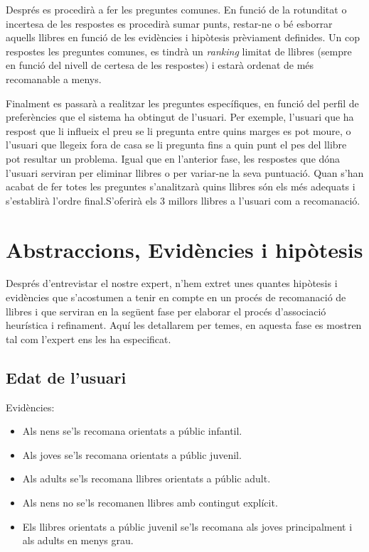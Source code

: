 Després es procedirà a fer les preguntes comunes. En funció de la rotunditat o incertesa de les respostes es procedirà sumar punts, restar-ne o bé esborrar aquells llibres en funció de les evidències i hipòtesis prèviament definides. Un cop respostes les preguntes comunes, es tindrà un \emph{ranking} limitat de llibres (sempre en funció del nivell de certesa de les respostes) i estarà ordenat de més recomanable a menys.

Finalment es passarà a realitzar les preguntes específiques, en funció del perfil de preferències que el sistema ha obtingut de l'usuari. Per exemple, l'usuari que ha respost que li influeix el preu se li pregunta entre quins marges es pot moure, o l'usuari que llegeix fora de casa se li pregunta fins a quin punt el pes del llibre pot resultar un problema. Igual que en l'anterior fase, les respostes que dóna l'usuari serviran per eliminar llibres o per variar-ne la seva puntuació. Quan s'han acabat de fer totes les preguntes s'analitzarà quins llibres són els més adequats i s'establirà l'ordre final.S'oferirà els 3 millors llibres a l'usuari com a recomanació.


\section{Abstraccions, Evidències i hipòtesis}

Després d'entrevistar el nostre expert, n'hem extret unes quantes hipòtesis i evidències que s'acostumen a tenir en compte en un procés de recomanació de llibres i que serviran en la següent fase per elaborar el procés d'associació heurística i refinament. Aquí les detallarem per temes, en aquesta fase es mostren tal com l'expert ens les ha especificat.

\subsection{Edat de l'usuari}
Evidències:
\begin{itemize}
  \item Als nens se'ls recomana orientats a públic infantil.
  \item Als joves se'ls recomana orientats a públic juvenil.  
  \item Als adults se'ls recomana llibres orientats a públic adult.
  \item Als nens no se'ls recomanen llibres amb contingut explícit.
  \item Els llibres orientats a públic juvenil se'ls recomana als joves principalment i als adults en menys grau.
\end{itemize}

